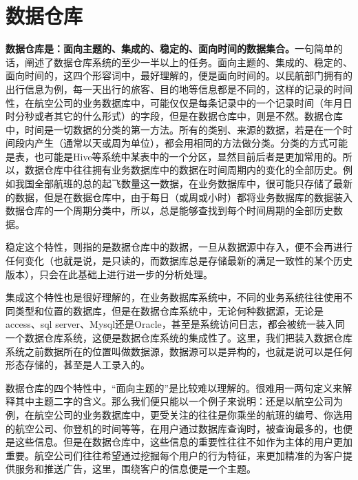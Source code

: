 \section{数据仓库}
\par \textbf{数据仓库是：面向主题的、集成的、稳定的、面向时间的数据集合。}一句简单的话，阐述了数据仓库系统的至少一半以上的任务。面向主题的、集成的、稳定的、面向时间的，这四个形容词中，最好理解的，便是面向时间的。以民航部门拥有的出行信息为例，每一天出行的旅客、目的地等信息都是不同的，这样的记录的时间性，在航空公司的业务数据库中，可能仅仅是每条记录中的一个记录时间（年月日时分秒或者其它的什么形式）的字段，但是在数据仓库中，则是不然。数据仓库中，时间是一切数据的分类的第一方法。所有的类别、来源的数据，若是在一个时间段内产生（通常以天或周为单位），都会用相同的方法做分类。分类的方式可能是表，也可能是Hive等系统中某表中的一个分区，显然目前后者是更加常用的。所以，数据仓库中往往拥有业务数据库中的数据在时间周期内的变化的全部历史。例如我国全部航班的总的起飞数量这一数据，在业务数据库中，很可能只存储了最新的数据，但是在数据仓库中，由于每日（或周或小时）都将业务数据库的数据装入数据仓库的一个周期分类中，所以，总是能够查找到每个时间周期的全部历史数据。
\par 稳定这个特性，则指的是数据仓库中的数据，一旦从数据源中存入，便不会再进行任何变化（也就是说，是只读的，而数据库总是存储最新的满足一致性的某个历史版本），只会在此基础上进行进一步的分析处理。
\par 集成这个特性也是很好理解的，在业务数据库系统中，不同的业务系统往往使用不同类型和位置的数据库，但是在数据仓库系统中，无论何种数据源，无论是access、sql server、Mysql还是Oracle，甚至是系统访问日志，都会被统一装入同一个数据仓库系统，这便是数据仓库系统的集成性了。这里，我们把装入数据仓库系统之前数据所在的位置叫做数据源，数据源可以是异构的，也就是说可以是任何形态存储的，甚至是人工录入的。
\par 数据仓库的四个特性中，“面向主题的”是比较难以理解的。很难用一两句定义来解释其中主题二字的含义。那么我们便只能以一个例子来说明：还是以航空公司为例，在航空公司的业务数据库中，更受关注的往往是你乘坐的航班的编号、你选用的航空公司、你登机的时间等等，在用户通过数据库查询时，被查询最多的，也便是这些信息。但是在数据仓库中，这些信息的重要性往往不如作为主体的用户更加重要。航空公司们往往希望通过挖掘每个用户的行为特征，来更加精准的为客户提供服务和推送广告，这里，围绕客户的信息便是一个主题。
